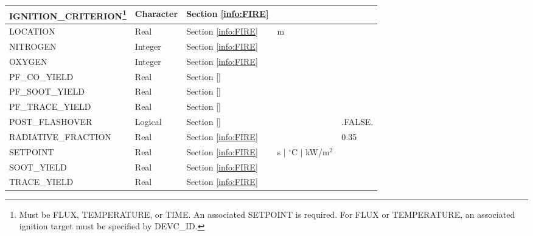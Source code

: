 \begin{minipage}{6.5in}
\begin{longtable}{@{\extracolsep{\fill}}|l|l|l|l|l|}
{\ct IGNITION\_CRITERION}\footnote{Must be {\ct FLUX}, {\ct TEMPERATURE}, or {\ct TIME}. An associated {\ct SETPOINT} is required. For {\ct FLUX} or {\ct TEMPERATURE}, an associated ignition target must be specified by {\ct DEVC\_ID}.}
                           & Character   & Section \ref{info:FIRE}                 &                             &                 \\ \hline
{\ct LOCATION}             & Real        & Section \ref{info:FIRE}                 & m                           &                 \\ \hline
{\ct NITROGEN}             & Integer     & Section \ref{info:FIRE}                 &                             &                 \\ \hline
{\ct OXYGEN}               & Integer     & Section \ref{info:FIRE}                 &                             &                 \\ \hline
{\ct PF\_CO\_YIELD}        & Real        & Section \ref{}                          &                             &                 \\ \hline
{\ct PF\_SOOT\_YIELD}      & Real        & Section \ref{}                          &                             &                 \\ \hline
{\ct PF\_TRACE\_YIELD}     & Real        & Section \ref{}                          &                             &                 \\ \hline
{\ct POST\_FLASHOVER}      & Logical     & Section \ref{}                          &                             &  {\ct .FALSE.}  \\ \hline
{\ct RADIATIVE\_FRACTION}  & Real        & Section \ref{info:FIRE}                 &                             &     0.35        \\ \hline
{\ct SETPOINT}             & Real        & Section \ref{info:FIRE}                 & s $\mid$ $^\circ$C $\mid$ kW/m$^2$  &         \\ \hline
{\ct SOOT\_YIELD}          & Real        & Section \ref{info:FIRE}                 &                             &                 \\ \hline
{\ct TRACE\_YIELD}         & Real        & Section \ref{info:FIRE}                 &                             &                 \\ \hline
\end{longtable}
\end{minipage}


